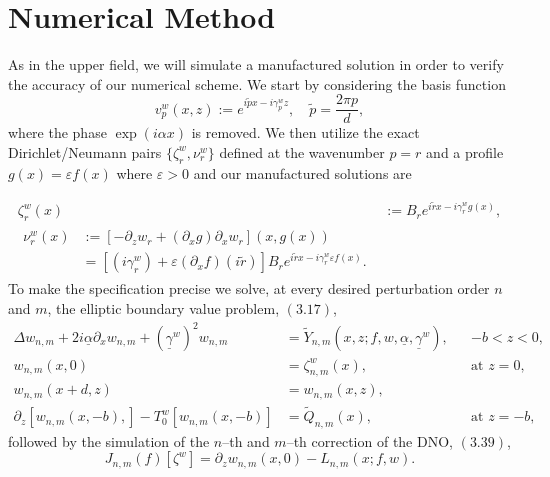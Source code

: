 \section{Numerical Method}
\label{intro:numerical results in lower field}

As in the upper field, we will simulate a manufactured solution in order to verify the accuracy of our numerical scheme. We start by considering the basis function
$$v^w_p(x,z):=e^{i\tilde{p}x-i\gamma^w_pz},\quad \tilde{p}=\frac{2\pi p}{d},$$
where the phase $\exp(i \alpha x)$ is removed. We then utilize the exact Dirichlet/Neumann pairs $\{\zeta_r^w,\nu_r^w\}$ defined at the wavenumber $p=r$ and a profile $g(x)=\varepsilon f(x)$ where $\varepsilon > 0$ and our manufactured solutions are

\begin{subequations}
\begin{align}
\zeta_r^w(x)&:= B_r e^{i\tilde{r} x - i\gamma_r^w g(x)}, \\
\begin{split}
\nu_r^w(x) &:= [-\partial_z w_r + (\partial_x g)\partial_x w_r](x,g(x))\\&=
[(i\gamma_r^w)+\varepsilon(\partial_x f)(i\tilde{r})]B_r e^{i\tilde{r} x - i\gamma_r^w \varepsilon f(x)}.
\end{split}
\end{align}
\end{subequations}
To make the specification precise we solve, at every desired perturbation order $n$ and $m$, the elliptic boundary value problem, $(3.17)$,
\begin{subequations}
\begin{align}
\Delta w_{n,m} +2i\underline{\alpha}\partial_{x}w_{n,m}+(\underline{\gamma}^w)^2w_{n,m}&=\tilde{Y}_{n,m}\left(x,z;f,w,\underline{\alpha},\underline{\gamma}^w\right), &&\text{$-b<z<0$}, \\
w_{n,m}(x,0)&=\zeta^w_{n,m}(x),&& \text{at $z=0$},\\
w_{n,m}(x+d,z)&=w_{n,m}(x,z), \\
\partial_z \left[w_{n,m}(x,-b),\right] - T_0^w[w_{n,m}(x,-b)]&=\tilde{Q}_{n,m}(x),&& \text{at $z=-b$},
\end{align}
\end{subequations}
followed by the simulation of the $n$--th and $m$--th correction of the DNO, $(3.39)$,
\begin{equation*}J_{n,m}(f)[\zeta^w]=\partial_z w_{n,m}(x,0)- L_{n,m}(x;f,w).\end{equation*}
